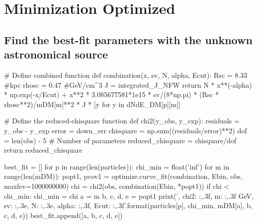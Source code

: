\documentclass[10pt, oneside]{book}
\numberwithin{equation}{chapter}
\begin{document}
\section{Minimization Optimized}
\subsection{Find the best-fit parameters with the unknown astronomical source}
\begin{python}
# Define combined function
def combination(x, sv, N, alpha, Ecut):
    Rsc = 8.33 #kpc
    rhosc = 0.47 #GeV/cm^3
    J = integrated_J_NFW
    return N * x**(-alpha) * np.exp(-x/Ecut) + x**2 * 3.085677581*1e15 * sv/(8*np.pi) * (Rsc * rhosc**2)/mDM[m]**2 * J * [y for y in dNdE_DM[p][m]]

# Define the reduced-chisquare function
def chi2(y_obs, y_exp):
    residuals = y_obs - y_exp
    error = down_err
    chisquare = np.sum((residuals/error)**2)
    dof = len(obs) - 5 # Number of parameters
    reduced_chisquare = chisquare/dof
    return reduced_chisquare


best_fit = []
for p in range(len(particles)):
    chi_min = float('inf')
    for m in range(len(mDM)):
        popt1, pcov1 = optimize.curve_fit(combination, Ebin, obs, maxfev=1000000000)
        chi = chi2(obs, combination(Ebin, *popt1))
        if chi < chi_min:
            chi_min = chi
            a = m
            b, c, d, e = popt1
    print('{}, chi2: {:,.3f}, m: {:,.3f} GeV, sv: {:,.3e}, N: {:,.3e}, alpha: {:,.3f}, Ecut: {:,.3f}'.format(particles[p], chi_min, mDM[a], b, c, d, e))
    best_fit.append([a, b, c, d, e])
\end{python}
\end{document}
